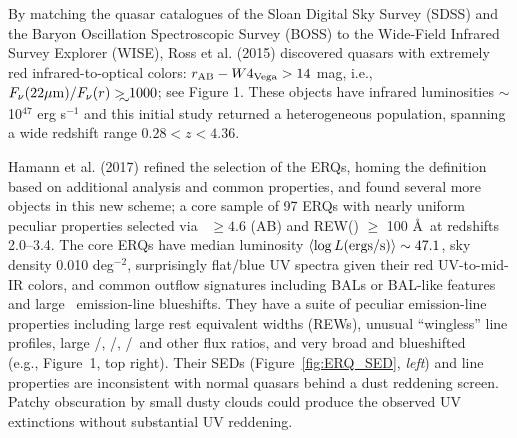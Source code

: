 \smallskip
\smallskip
\noindent
By matching the quasar catalogues of the Sloan Digital Sky Survey
(SDSS) and the Baryon Oscillation Spectroscopic Survey (BOSS) to the
Wide-Field Infrared Survey Explorer (WISE), Ross et al. (2015)
discovered quasars with extremely red infrared-to-optical colors:
$r_{\rm AB}-W4_{\rm Vega}>14$ mag, i.e., $F_\nu({\rm 22\mu
m})/F_\nu(r) \gtrsim 1000$; see Figure 1. These objects have infrared
luminosities $\sim$10$^{47}$ erg s$^{-1}$ and this initial study
returned a heterogeneous population, spanning a wide redshift range
$0.28 < z < 4.36$.

\smallskip
\smallskip
\noindent
Hamann et al. (2017) refined the selection of the ERQs, homing the
definition based on additional analysis and common properties, and
found several more objects in this new scheme; a core sample of 97
ERQs with nearly uniform peculiar properties selected via \imw\ $\ge
4.6$ (AB) and REW(\civ ) $\ge$ 100 \AA\ at redshifts 2.0--3.4.  The
core ERQs have median luminosity $\left<\log L ({\rm ergs/s})\right>
\sim 47.1$, sky density 0.010 deg$^{-2}$, surprisingly flat/blue UV
spectra given their red UV-to-mid-IR colors, and common outflow
signatures including BALs or BAL-like features and large \civ\
emission-line blueshifts.  They have a suite of peculiar emission-line
properties including large rest equivalent widths (REWs), unusual
``wingless'' line profiles, large \nv /\lya , \nv /\civ , \siiv /\civ\
and other flux ratios, and very broad and blueshifted \oiii\ 
(e.g., Figure~1, top right).  Their SEDs (Figure~\ref{fig:ERQ_SED},
{\it left}) and line properties are inconsistent with normal quasars
behind a dust reddening screen. Patchy obscuration by small dusty
clouds could produce the observed UV extinctions without substantial
UV reddening.


